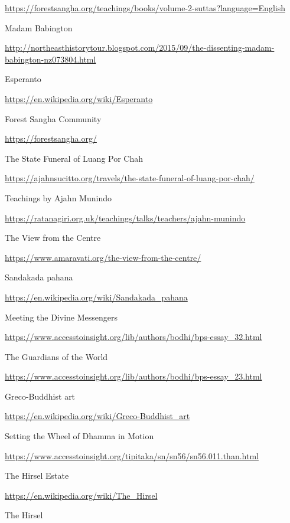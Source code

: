 \begin{thebibliography}{9}
  {\urlsize \url{https://forestsangha.org/teachings/books/volume-2-suttas?language=English}}

 Madam Babington

  {\urlsize \url{http://northeasthistorytour.blogspot.com/2015/09/the-dissenting-madam-babington-nz073804.html}}

 Esperanto

  {\urlsize \url{https://en.wikipedia.org/wiki/Esperanto}}

 Forest Sangha Community

  {\urlsize \url{https://forestsangha.org/}}

 The State Funeral of Luang Por Chah

  {\urlsize \url{https://ajahnsucitto.org/travels/the-state-funeral-of-luang-por-chah/}}

 Teachings by Ajahn Munindo

  {\urlsize \url{https://ratanagiri.org.uk/teachings/talks/teachers/ajahn-munindo}}

 The View from the Centre

  {\urlsize \url{https://www.amaravati.org/the-view-from-the-centre/}}

 Sandakada pahana

  {\urlsize \url{https://en.wikipedia.org/wiki/Sandakada_pahana}}

 Meeting the Divine Messengers

  {\urlsize \url{https://www.accesstoinsight.org/lib/authors/bodhi/bps-essay_32.html}}

 The Guardians of the World

  {\urlsize \url{https://www.accesstoinsight.org/lib/authors/bodhi/bps-essay_23.html}}

 Greco-Buddhist art

  {\urlsize \url{https://en.wikipedia.org/wiki/Greco-Buddhist_art}}

 Setting the Wheel of Dhamma in Motion

  {\urlsize \url{https://www.accesstoinsight.org/tipitaka/sn/sn56/sn56.011.than.html}}

 The Hirsel Estate

  {\urlsize \url{https://en.wikipedia.org/wiki/The_Hirsel}}

 The Hirsel


\end{thebibliography}
